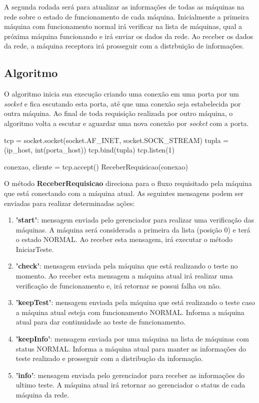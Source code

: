 A segunda rodada será para atualizar as informações de todas as máquinas na rede sobre o estado de funcionamento de cada máquina. Inicialmente a primeira máquina com funcionamento normal 
irá verificar na lista de máquinas, qual a próxima máquina funcionando e irá enviar os dados da rede. Ao receber os dados da rede, a máquina receptora irá prosseguir com a distrbuição 
de informações.

\subsection{Algoritmo}
\label{sub:adaptiveDSD_Algoritmo}
O algoritmo \adaptive inicia sua execução criando uma conexão em uma porta por um \textit{socket} e fica escutando esta porta, até que uma conexão seja estabelecida por outra máquina.
Ao final de toda requisição realizada por outro máquina, o algoritmo volta a escutar e aguardar uma nova conexão por \textit{socket} com a porta.

\vspace*{1cm}
\begin{python}
    tcp = socket.socket(socket.AF_INET, socket.SOCK_STREAM)
    tupla = (ip_host, int(porta_host))
    tcp.bind(tupla)
    tcp.listen(1)

    conexao, cliente = tcp.accept() 
    ReceberRequisicao(conexao)
\end{python}
\vspace*{1cm}

O método \textbf{ReceberRequisicao} direciona para o fluxo requisitado pela máquina que está conectando com a máquina atual. As seguintes mensagens podem ser enviadas para realizar determinadas ações:

\vspace*{1cm}
\begin{enumerate}
    \item \textbf{'start'}: mensagem enviada pelo gerenciador para realizar uma verificação das máquinas. A máquina será considerada a primeira da lista (posição 0) e terá o estado NORMAL. Ao receber esta mensagem,
    irá executar o método IniciarTeste.
    \item \textbf{'check'}: mensagem enviada pela máquina que está realizando o teste no momento. Ao receber esta mensagem a máquina atual irá realizar uma verificação de funcionamento e, 
    irá retornar se possui falha ou não.
    \item \textbf{'keepTest'}: mensagem enviada pela máquina que está realizando o teste caso a máquina atual esteja com funcionamento NORMAL. Informa a máquina atual para dar continuidade ao teste de funcionamento.
    \item \textbf{'keepInfo'}: mensagem enviada por uma máquina na lista de máquinas com status NORMAL. Informa a máquina atual para manter as informações do teste realizado e prosseguir com a distribução da informação.
    \item \textbf{'info'}: mensagem enviada pelo gerenciador para receber as informações do ultimo teste. A máquina atual irá retornar ao gerenciador o status de cada máquina da rede.
  \end{enumerate}

